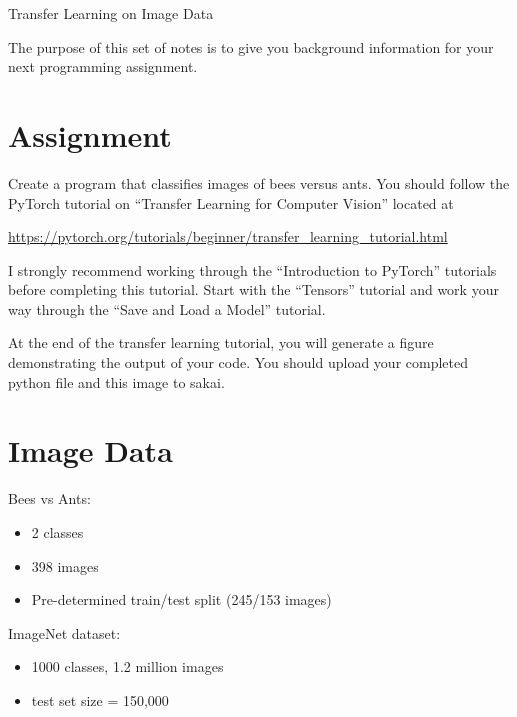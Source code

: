 \documentclass[10pt]{exam}
\theoremstyle{definition}
\begin{document}
\begin{center}
{
\Huge
Transfer Learning on Image Data
}
\end{center}

The purpose of this set of notes is to give you background information for your next programming assignment.

\section{Assignment}

Create a program that classifies images of bees versus ants.
You should follow the PyTorch tutorial on ``Transfer Learning for Computer Vision'' located at

\url{https://pytorch.org/tutorials/beginner/transfer_learning_tutorial.html}

\noindent
I strongly recommend working through the ``Introduction to PyTorch'' tutorials before completing this tutorial.
Start with the ``Tensors'' tutorial and work your way through the ``Save and Load a Model'' tutorial.

At the end of the transfer learning tutorial, you will generate a figure demonstrating the output of your code.
You should upload your completed python file and this image to sakai.


\section{Image Data}

Bees vs Ants:

\begin{itemize}
\item 2 classes

\item 398 images

\item Pre-determined train/test split (245/153 images)
\end{itemize}

\noindent
ImageNet dataset:

\begin{itemize}
    \item 1000 classes, 1.2 million images

    \item test set size = 150,000

\end{itemize}
\end{document}
